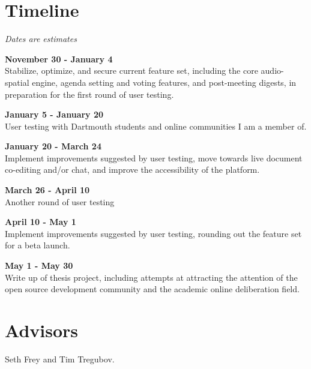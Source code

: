 \documentclass{article}
\begin{document}
\section{Timeline}

\textit{Dates are estimates}

\textbf{November 30 - January 4} \\
Stabilize, optimize, and secure current feature set, including the core audio-spatial
engine, agenda setting and voting features, and post-meeting digests, in preparation for
the first round of user testing.

\textbf{January 5 - January 20} \\
User testing with Dartmouth students and online communities I am a member of.

\textbf{January 20 - March 24} \\
Implement improvements suggested by user testing, move towards live document co-editing
and/or chat, and improve the accessibility of the platform.

\textbf{March 26 - April 10} \\
Another round of user testing

\textbf{April 10 - May 1} \\
Implement improvements suggested by user testing, rounding out the feature set for
a beta launch.

\textbf{May 1 - May 30} \\
Write up of thesis project, including attempts at attracting the attention
of the open source development community and the academic online deliberation field.

\section{Advisors}
Seth Frey and Tim Tregubov.
\end{document}
